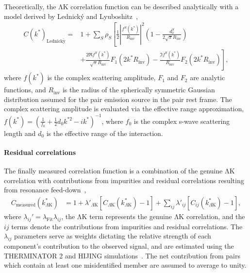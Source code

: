 \documentclass{svproc}
\newcommand{\LamK}{$\mathrm{\Lambda}\mathrm{K}$\xspace}
\begin{document}
Theoretically, the \LamK correlation function can be described analytically with a model derived by Lednick\'y and Lyuboshitz~\cite{Lednicky:82},
\begin{equation}
\begin{aligned}
C(k^{*})_{\mathrm{Lednick\acute{y}}} = &1 + \sum_{S}\rho_{S}\left[\frac{1}{2}\left|\frac{f^{S}(k^{*})}{R_{\mathrm{inv}}}\right|^2\left(1-\frac{d^{S}_{0}}{2\sqrt{\pi}R_{\mathrm{inv}}}\right) \right. \\
&+ \left. \frac{2\Re f^{S}(k^{*})}{\sqrt{\pi}R_{\mathrm{inv}}}F_{1}(2k^{*}R_{\mathrm{inv}})-\frac{\Im f^{S}(k^{*})}{R_{\mathrm{inv}}}F_{2}(2k^{*}R_{\mathrm{inv}})\right],
\end{aligned}  
\label{eqn:LednickyEqn}
\end{equation}
where $f(k^{*})$ is the complex scattering amplitude, $F_{1}$ and $F_{2}$ are analytic functions, and $R_{\mathrm{inv}}$ is the radius of the spherically symmetric Gaussian distribution assumed for the pair emission source in the pair rest frame.
The complex scattering amplitude is evaluated via the effective range approximation, $f(k^{*}) = \left( \frac{1}{f_{0}} + \frac{1}{2}d_{0}k^{*2} - ik^{*} \right)^{-1}$, where $f_{0}$ is the complex s-wave scattering length and $d_{0}$ is the effective range of the interaction.



\paragraph{Residual correlations}
\label{ResidualCorrelations}

The finally measured correlation function is a combination of the genuine \LamK correlation with contributions from impurities and residual correlations resulting from resonance feed-down~\cite{Kisiel:2014mma},
\begin{equation}
\begin{aligned}
\label{eqn:CfwRes} 
 C_{\mathrm{measured}}(k^{*}_{\Lambda\mathrm{K}}) &= 1 + \lambda'_{\Lambda\mathrm{K}}[C_{\Lambda\mathrm{K}}(k^{*}_{\Lambda\mathrm{K}}) - 1] + \sum\limits_{ij}  \lambda'_{ij}[C_{ij}(k^{*}_{\Lambda\mathrm{K}})-1],
\end{aligned} 
\end{equation}
where $\lambda_{ij}' = \lambda_{\mathrm{Fit}}\lambda_{ij}$, the \LamK term represents the genuine \LamK correlation, and the $ij$ terms denote the contributions from impurities and residual correlations.
The $\lambda_{ij}$ parameters serve as weights dictating the relative strength of each component's contribution to the observed signal, and are estimated using the THERMINATOR 2 and HIJING simulations~\cite{Kisiel:2014mma,Acharya:2018gyz}.
The net contribution from pairs which contain at least one misidentified member are assumed to average to unity.
\end{document}
